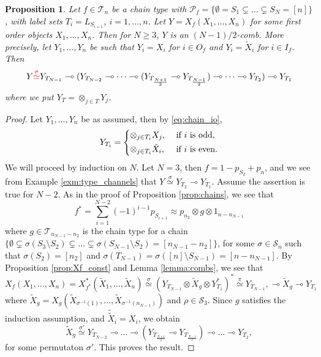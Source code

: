 \documentclass[12pt]{article}
\newtheorem{prop}{Proposition}
\theoremstyle{definition}
\theoremstyle{remark}
\def\Te{\mathcal T}
\def\Pe{\mathcal P}
\def\permut{\mathscr{S}}
\begin{document}
\begin{prop}\label{prop:chains_combs}  Let $f\in \Te_n$ be a chain type with
$\Pe_f=\{\emptyset=S_1\subsetneq\dots \subsetneq S_N=[n]\}$, with
label sets  $T_i=L_{S_{i+1}}$,  $i=1,\dots,n$.  Let $Y=X_f(X_1,\dots,X_n)$ for some first order objects $X_1,\dots, X_n$. 
Then for $N\ge 3$, $Y$ is an $(N-1)/2$-comb. 
More precisely, let $Y_1,\dots, Y_n$ be such that $Y_i=X_i$ for $i\in O_f$ and $Y_i=\tilde X_i$ for $i\in I_f$.
Then
\[
Y{\color{red}\overset{\sigma}{\simeq}}
Y_{T_{N-1}}\multimap (Y_{T_{N-2}}\multimap\dots \multimap (Y_{T_{\frac{N+1}2}}\multimap
Y_{T_{\frac{N-1}2}})\multimap\dots\multimap Y_{T_2})\multimap Y_{T_1} 
 \]
 where we put $Y_T=\otimes_{j\in T} Y_j$.

\end{prop}



\begin{proof} Let $Y_1,\dots,Y_n$ be as assumed, then  by \eqref{eq:chain_io}, 
\[
Y_{T_i}=\begin{dcases} \otimes_{j\in T_i}X_j,  & \text{ if } i\text{ is odd},\\
\otimes_{j\in T_i}\tilde X_i,& \text{ if }i\text{ is even}.
\end{dcases}
\]
We will proceed by induction on $N$.
Let $N=3$, then $f=1-p_{S_2}+p_{n}$, and we see from Example \ref{exm:type_channels}
that  $Y\overset{\sigma}{\simeq} Y_{T_2}\multimap  Y_{T_1}$. 
Assume the assertion is true for  $N-2$.  As in the proof of Proposition \ref{prop:chains}, we see that 
\[
f^*=\sum_{i=1}^{N-2}(-1)^{i-1}p_{S_{i+1}}\approx p_{n_2}\otimes g\otimes 1_{n-n_{N-1}}
\]
where $g\in \Te_{n_{N-1}-n_2}$ is the chain type for  a chain $\{\emptyset\subsetneq
\sigma(S_3\setminus S_2)\subsetneq \dots\subsetneq \sigma(S_{N-1}\setminus
S_{2})=[n_{N-1}-n_2]\}$, for some $\sigma\in \permut_n$ such that $\sigma(S_2)=[n_2]$
and $\sigma(T_{N-1})=\sigma([n]\setminus S_{N-1})=[n-n_{N-1}]$. 
 By Proposition \ref{prop:Xf_const} and Lemma \ref{lemma:combs}, we see that 
\[
X_f(X_1,\dots,X_n)=X_{f^*}^*(\tilde X_1,\dots, \tilde X_n)\overset{\sigma}\simeq (Y_{T_{N-1}}\otimes
\tilde X_g\otimes Y^*_{T_1})^*\overset{\pi}{\simeq} Y_{T_{N-1}},\multimap \tilde
X_g\multimap Y_{T_1}
\]
where $\tilde X_g=X_g(\tilde X_{\sigma^{-1}(1)},\dots, \tilde X_{\sigma^{-1}(n_{N-1})})$
and $\rho\in \permut_3$. Since $g$ satisfies the induction assumption, and $\tilde {\tilde
X}_i=X_i$, we obtain 
\[
\tilde X_g\overset{\sigma'}{\simeq}
Y_{T_{N-2}}\multimap \dots\multimap (Y_{T_{\frac{N+1}2}}\multimap
Y_{T_{\frac{N-1}2}})\multimap \dots \multimap Y_{T_2},
\]
for some permutaton $\sigma'$. This proves the result.


\end{proof}
\end{document}
